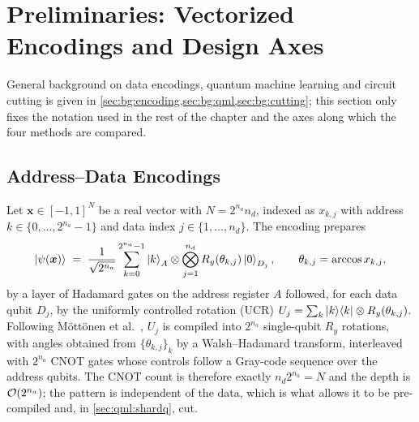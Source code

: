 \section{Preliminaries: Vectorized Encodings and Design Axes}\label{sec:qml:prelim}

General background on data encodings, quantum machine learning and circuit cutting is given in \cref{sec:bg:encoding,sec:bg:qml,sec:bg:cutting}; this section only fixes the notation used in the rest of the chapter and the axes along which the four methods are compared.

\subsection{Address--Data Encodings}\label{sec:qml:prelim:ucr}

Let $\bm{x} \in [-1,1]^{N}$ be a real vector with $N = 2^{n_a} n_d$, indexed as $x_{k,j}$ with address $k \in \{0,\dots,2^{n_a}-1\}$ and data index $j \in \{1,\dots,n_d\}$. The \qcrank{} encoding \cite{balewski2024qcrank} prepares
\begin{equation}\label{eq:qml:qcrank}
\ket{\psi(\bm{x})} \;=\; \frac{1}{\sqrt{2^{n_a}}} \sum_{k=0}^{2^{n_a}-1} \ket{k}_A \otimes \bigotimes_{j=1}^{n_d} R_y(\theta_{k,j})\ket{0}_{D_j},
\qquad \theta_{k,j} = \arccos x_{k,j},
\end{equation}
by a layer of Hadamard gates on the address register $A$ followed, for each data qubit $D_j$, by the uniformly controlled rotation (UCR) $U_j = \sum_k \ket{k}\!\bra{k} \otimes R_y(\theta_{k,j})$. Following Möttönen et al.~\cite{mottonen2004ucr}, $U_j$ is compiled into $2^{n_a}$ single-qubit $R_y$ rotations, with angles obtained from $\{\theta_{k,j}\}_k$ by a Walsh--Hadamard transform, interleaved with $2^{n_a}$ CNOT gates whose controls follow a Gray-code sequence over the address qubits. The CNOT count is therefore exactly $n_d 2^{n_a} = N$ and the depth is $\mathcal{O}\!\left(2^{n_a}\right)$; the pattern is independent of the data, which is what allows it to be pre-compiled and, in \cref{sec:qml:shardq}, cut.

